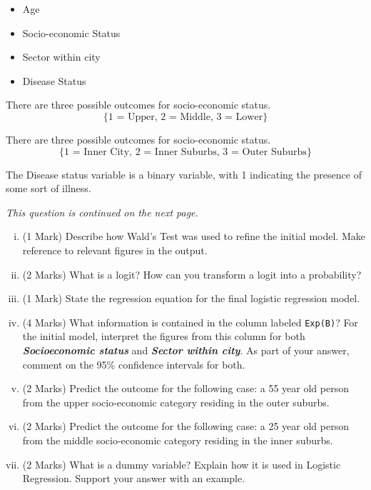\documentclass[a4paper,12pt]{article}
\begin{document}
\begin{enumerate}
\begin{enumerate}[(a)]
\begin{itemize}
	\item Age
	\item Socio-economic Status
	\item Sector within city
	\item Disease Status
\end{itemize}
There are three possible outcomes for socio-economic status.
\[\{\mbox{1 = Upper, 2 = Middle, 3 = Lower}\}\]

There are three possible outcomes for socio-economic status.
\[\{\mbox{1 = Inner City, 2 = Inner Suburbs, 3 = Outer Suburbs}\}\]

The Disease status variable is a binary variable, with 1 indicating the presence of some sort of illness.

\noindent \textit{This question is continued on the next page.}





\begin{enumerate}[(i)]
\item (1 Mark) Describe how Wald's Test was used to refine the initial model. Make reference to relevant figures in the output.
\item (2 Marks)
What is a logit? How can you transform a logit into a probability?

\item (1 Mark) State the regression equation for the final logistic regression model.
\item (4 Marks) What information is contained in the column labeled \texttt{Exp(B)}? For the initial model, interpret the figures from this column for both \textbf{\textit{Socioeconomic status}} and \textbf{\textit{Sector within city}}. 
As part of your answer, comment on the 95\% confidence intervals for both.


\item (2 Marks) Predict the outcome for the following case: a 55 year old person from the upper socio-economic category residing in the outer suburbs.
\item (2 Marks) Predict the outcome for the following case: a 25 year old person  from the middle socio-economic category residing in the inner suburbs.

\item (2 Marks)
What is a dummy variable? Explain how it is used in Logistic Regression. Support your answer with an example.
\end{enumerate}


\end{enumerate}
\end{enumerate}
\end{document}
